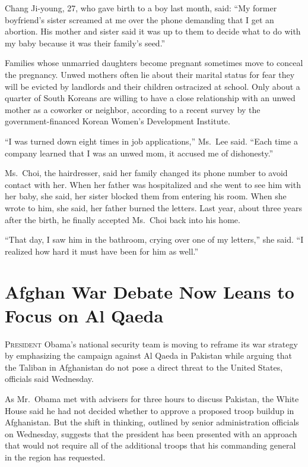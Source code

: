 ﻿\documentclass[12pt]{article}
\begin{document}
Chang Ji-young, 27, who gave birth to a boy last month, said: ``My former boyfriend's sister
screamed at me over the phone demanding that I get an abortion. His mother and sister said it was up
to them to decide what to do with my baby because it was their family's seed.''

Families whose unmarried daughters become pregnant sometimes move to conceal the pregnancy. Unwed
mothers often lie about their marital status for fear they will be evicted by landlords and their
children ostracized at school. Only about a quarter of South Koreans are willing to have a close
relationship with an unwed mother as a coworker or neighbor, according to a recent survey by the
government-financed Korean Women's Development Institute.

``I was turned down eight times in job applications,'' Ms.~Lee said. ``Each time a company learned
that I was an unwed mom, it accused me of dishonesty.''

Ms.~Choi, the hairdresser, said her family changed its phone number to avoid contact with her. When
her father was hospitalized and she went to see him with her baby, she said, her sister blocked them
from entering his room. When she wrote to him, she said, her father burned the letters. Last year,
about three years after the birth, he finally accepted Ms.~Choi back into his home.

``That day, I saw him in the bathroom, crying over one of my letters,'' she said. ``I realized how
hard it must have been for him as well.''

\section{Afghan War Debate Now Leans to Focus on Al Qaeda}

\lettrine{P}{resident} Obama's national security team is moving to reframe
its war strategy by emphasizing the campaign against Al Qaeda in Pakistan while arguing that the
Taliban in Afghanistan do not pose a direct threat to the United States, officials said Wednesday.

As Mr.~Obama met with advisers for three hours to discuss Pakistan, the White House said he had not
decided whether to approve a proposed troop buildup in Afghanistan. But the shift in thinking,
outlined by senior administration officials on Wednesday, suggests that the president has been
presented with an approach that would not require all of the additional troops that his commanding
general in the region has requested.
\end{document}
